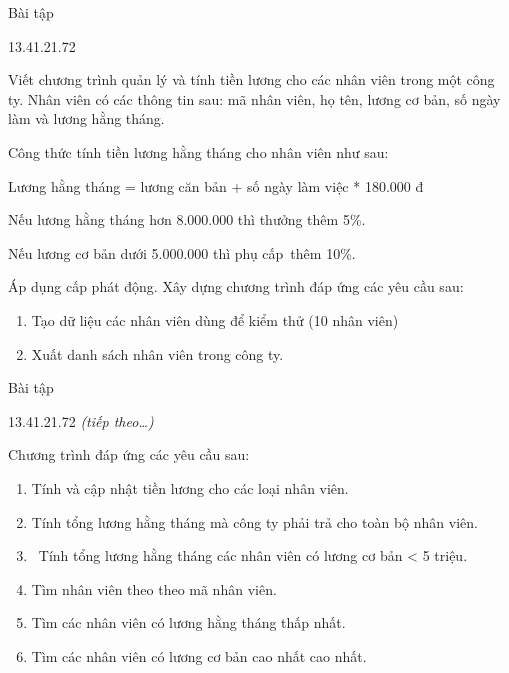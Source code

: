 \begin{frame}{Bài tập}
\begin{blk}{13.4}{1.2}{1.72}\fontsize{11.5}{13.8}\selectfont
{}\par
Viết chương trình quản lý và tính tiền lương cho các nhân viên trong một công ty. Nhân viên có các thông tin sau: mã nhân viên, họ tên, lương cơ bản, số ngày làm và lương hằng tháng.\par\vspace{3pt}
Công thức tính tiền lương hằng tháng cho nhân viên như sau:\par\vspace{3pt}
\hspace*{1.0cm}Lương hằng tháng = lương căn bản + số ngày làm việc * 180.000 đ\par\vspace{3pt}
\hspace*{1.0cm}Nếu lương hằng tháng hơn 8.000.000 thì thưởng thêm 5\%.\par\vspace{3pt}
\hspace*{1.0cm}Nếu lương cơ bản dưới 5.000.000 thì phụ cấp\, thêm 10\%.\par\vspace{3pt}
Áp dụng cấp phát động. Xây dựng chương trình đáp ứng các yêu cầu sau:
\begin{enumerate}[label=\arabic*.,leftmargin=1.55em,labelindent=0pt,labelsep=0.35em,align=left,itemsep=4pt]
\item Tạo dữ liệu các nhân viên dùng để kiểm thử (10 nhân viên)
\item Xuất danh sách nhân viên trong công ty.
\end{enumerate}
\end{blk}
\end{frame}

\begin{frame}{Bài tập}
\begin{blk}{13.4}{1.2}{1.72}\fontsize{11.5}{13.8}\selectfont
{} \textit{(tiếp theo…)}\par
Chương trình đáp ứng các yêu cầu sau:
\begin{enumerate}[label=\arabic*.,leftmargin=1.55em,labelindent=0pt,labelsep=0.35em,align=left,itemsep=4pt,start=3]
\item Tính và cập nhật tiền lương cho các loại nhân viên.
\item Tính tổng lương hằng tháng mà công ty phải trả cho toàn bộ nhân viên.
\item \ Tính tổng lương hằng tháng các nhân viên có lương cơ bản < 5 triệu.
\item Tìm nhân viên theo theo mã nhân viên.
\item Tìm các nhân viên có lương hằng tháng thấp nhất.
\item Tìm các nhân viên có lương cơ bản cao nhất cao nhất.
\end{enumerate}
\end{blk}
\end{frame}

\ThankYouSlide
\QandASlide
